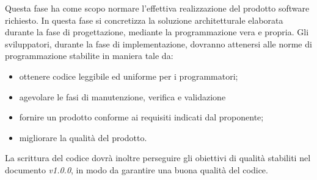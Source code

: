         Questa fase ha come scopo normare l'effettiva realizzazione del prodotto software richiesto. In questa fase si concretizza la soluzione architetturale elaborata durante la fase di progettazione, mediante la programmazione vera e propria.    
        Gli sviluppatori, durante la fase di implementazione, dovranno attenersi alle norme di programmazione stabilite in maniera tale da: 
        \begin{itemize}
        	\item ottenere codice leggibile ed uniforme per i programmatori; 
        	\item agevolare le fasi di manutenzione, verifica e validazione
        	\item fornire un prodotto conforme ai requisiti indicati dal proponente; 
        	\item migliorare la qualità del prodotto.
    	\end{itemize} 
    
    	\noindent La scrittura del codice dovrà inoltre perseguire gli obiettivi di qualità stabiliti nel documento \textit{\PdQ{} v1.0.0}, in modo da garantire una buona qualità del codice. 
